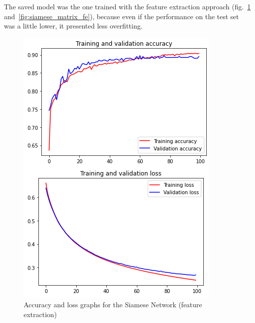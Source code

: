 \documentclass[11pt,a4paper,oneside]{article}
\begin{document}
The saved model was the one trained with the feature extraction approach (fig.~\ref{fig:siamese_accuracy_fe} and~\ref{fig:siamese_matrix_fe}), because even if the performance on the test set was a little lower, it presented less overfitting.


\begin{figure}[h]
\centering
	\begin{minipage}[c]{.4\textwidth}
		\centering\setlength{\captionmargin}{0pt}%
		\includegraphics[width=.9\textwidth]{images/4.1/Siamese/Accuracy_fe}
		\caption{Accuracy and loss graphs for the Siamese Network (feature extraction)}
		\label{fig:siamese_accuracy_fe}
	\end{minipage}
	\hspace{5mm}%
	\begin{minipage}[c]{.4\textwidth}
		\centering\setlength{\captionmargin}{0pt}%

\end{minipage}
\end{figure}
\end{document}
